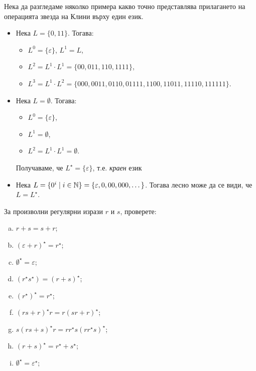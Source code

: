 \begin{example}
  Нека да разгледаме няколко примера какво точно представлява прилагането
  на операцията звезда на Клини върху един език.
  \begin{itemize}
  \item 
    Нека $L = \{0,11\}$. Тогава:
    \begin{itemize}
    \item 
      $L^0 = \{\varepsilon\}$, $L^1 = L$,
    \item
      $L^2 = L^1\cdot L^1 = \{00,011,110,1111\}$,
    \item
      $L^3 = L^1\cdot L^2 = \{000,0011,0110,01111,1100,11011,11110,111111\}$.
    \end{itemize}
  \item
    Нека $L = \emptyset$.
    Тогава:
    \begin{itemize}
    \item 
      $L^0 = \{\varepsilon\}$,
    \item
      $L^1 = \emptyset$,
    \item
      $L^2 = L^1 \cdot L^1 = \emptyset$.
    \end{itemize}    
    Получаваме, че $L^\star = \{\varepsilon\}$, т.е. {\em краен} език
  \item
    Нека $L = \{0^i\mid i \in \mathbb{N}\} = \{\varepsilon, 0, 00, 000, \dots\}$.
    Тогава лесно може да се види, че $L = L^\star$.
  \end{itemize}
\end{example}

\begin{problem}
  За произволни регулярни изрази $r$ и $s$, 
  проверете:
  \begin{enumerate}[a)]
  \item 
    $r+s = s + r$;
  \item
    $(\varepsilon + r)^\star = r^\star$;
  \item
    $\emptyset^\star = \varepsilon$;
  \item
    $(r^\star s^\star) = (r+s)^\star$;
  \item
    $(r^\star)^\star = r^\star$;
  \item
    $(rs + r)^\star r = r(sr+r)^\star$;
  \item
    $s(rs+s)^\star r = rr^\star s(rr^\star s)^\star$;
  \item
    $(r+s)^\star = r^\star + s^\star$;
  \item
    $\emptyset^\star = \varepsilon^\star$;
  \end{enumerate}
\end{problem}


